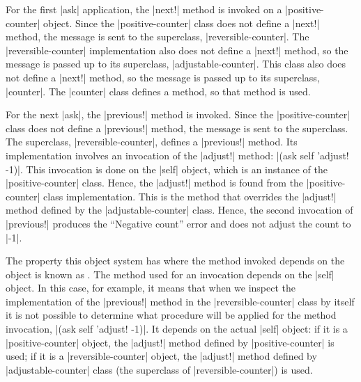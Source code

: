 \begin{schemeregion}

For the first \scheme|ask| application, the \scheme|next!| method is invoked on a \scheme|positive-counter| object.  Since the \scheme|positive-counter| class does not define a \scheme|next!| method, the message is sent to the superclass, \scheme|reversible-counter|.  The \scheme|reversible-counter| implementation also does not define a \scheme|next!| method, so the message is passed up to its superclass, \scheme|adjustable-counter|.  This class also does not define a \scheme|next!| method, so the message is passed up to its superclass, \scheme|counter|.  The \scheme|counter| class defines a  method, so that method is used.

For the next \scheme|ask|, the \scheme|previous!| method is invoked.  Since the \scheme|positive-counter| class does not define a \scheme|previous!| method, the message is sent to the superclass.  The superclass, \scheme|reversible-counter|, defines a \scheme|previous!| method.  Its implementation involves an invocation of the \scheme|adjust!| method: \scheme|(ask self 'adjust! -1)|.  This invocation is done on the \scheme|self| object, which is an instance of the \scheme|positive-counter| class.  Hence, the \scheme|adjust!| method is found from the \scheme|positive-counter| class implementation.  This is the method that overrides the \scheme|adjust!| method defined by the \scheme|adjustable-counter| class.  Hence, the second invocation of \scheme|previous!| produces the ``Negative count'' error and does not adjust the count to \schemeresult|-1|.  

The property this object system has where the method invoked depends on the object is known as .  The method used for an invocation depends on the \scheme|self| object.  In this case, for example, it means that when we inspect the implementation of the \scheme|previous!| method in the \scheme|reversible-counter| class by itself it is not possible to determine what procedure will be applied for the method invocation, \scheme|(ask self 'adjust! -1)|.  It depends on the actual \scheme|self| object: if it is a \scheme|positive-counter| object, the \scheme|adjust!| method defined by \scheme|positive-counter| is used; if it is a \scheme|reversible-counter| object, the \scheme|adjust!| method defined by \scheme|adjustable-counter| class (the superclass of \scheme|reversible-counter|) is used.  


\end{schemeregion}
